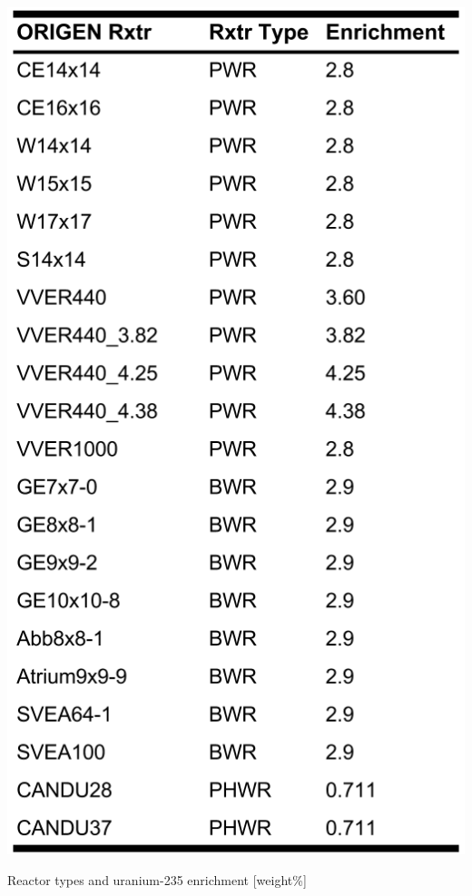 \begin{table}[!hp]
  \centering
  \begin{subtable}{\linewidth}
    \centering
    \includegraphics[height=0.7\textheight]{./chapters/demo_method/TrainData.png}
    \caption{Reactor types and uranium-235 enrichment [weight\%]}
    \label{tbl:rxtrtype}
    \vspace*{5mm}
  \end{subtable}

\end{table}
